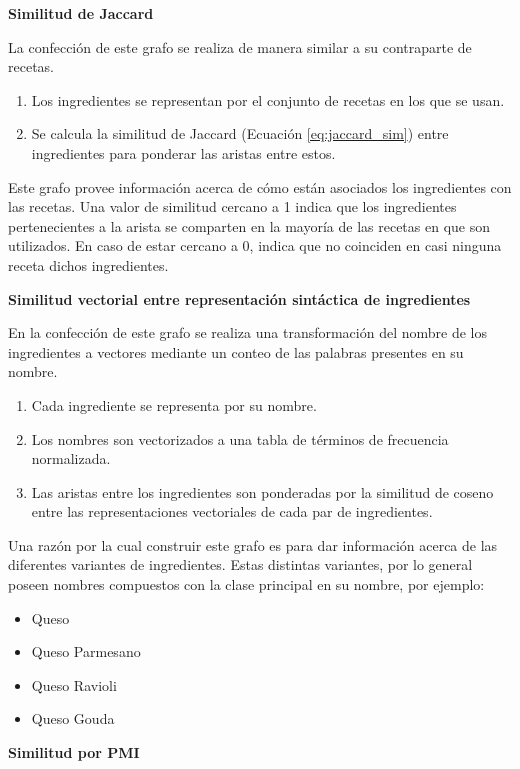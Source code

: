 \documentclass[
	a4paper, %
	10pt, %
	unnumberedsections, %
	twoside, %
]{LTJournalArticle}
\begin{document}
\textbf{Similitud de Jaccard}

La confección de este grafo se realiza de manera similar a su contraparte de recetas.

\begin{enumerate}
	\item Los ingredientes se representan por el conjunto de recetas en los que se usan.
	\item Se calcula la similitud de Jaccard (Ecuación \ref{eq:jaccard_sim}) entre ingredientes para ponderar las aristas
	entre estos.
\end{enumerate}

Este grafo provee información acerca de cómo están asociados los ingredientes con las recetas. Una valor de similitud
cercano a 1 indica que los ingredientes pertenecientes a la arista se comparten en la mayoría de las recetas en que son
utilizados. En caso de estar cercano a 0, indica que no coinciden en casi ninguna receta dichos ingredientes.

\textbf{Similitud vectorial entre representación sintáctica de ingredientes}

En la confección de este grafo se realiza una transformación del nombre de los ingredientes a vectores mediante
un conteo de las palabras presentes en su nombre.

\begin{enumerate}
	\item Cada ingrediente se representa por su nombre.
	\item Los nombres son vectorizados a una tabla de términos de frecuencia normalizada.
	\item Las aristas entre los ingredientes son ponderadas por la similitud de coseno entre las 
	representaciones vectoriales de cada par de ingredientes.
\end{enumerate}

Una razón por la cual construir este grafo es para dar información acerca de las diferentes variantes de ingredientes.
Estas distintas variantes, por lo general poseen nombres compuestos con la clase principal en su nombre, por ejemplo:

\begin{itemize}
	\item Queso
	\item Queso Parmesano
	\item Queso Ravioli
	\item Queso Gouda
\end{itemize}

\textbf{Similitud por PMI}
\end{document}

